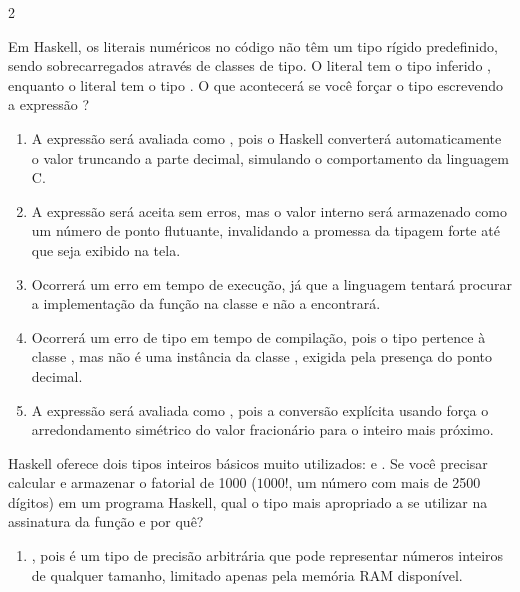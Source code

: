 \documentclass[a4paper,10pt,brazil]{article}
\begin{document}
\begin{multicols}{2}
\begin{enumerate}
\end{enumerate}

Em Haskell, os literais numéricos no código não têm um tipo rígido predefinido, sendo sobrecarregados através de classes de tipo. O literal  tem o tipo inferido , enquanto o literal  tem o tipo . 
O que acontecerá se você forçar o tipo escrevendo a expressão ?

\begin{enumerate}
  \item A expressão será avaliada como , pois o Haskell converterá automaticamente o valor truncando a parte decimal, simulando o comportamento da linguagem C.

  \item A expressão será aceita sem erros, mas o valor interno será armazenado como um número de ponto flutuante, invalidando a promessa da tipagem forte até que seja exibido na tela.

  \item Ocorrerá um erro em tempo de execução, já que a linguagem tentará procurar a implementação da função  na classe  e não a encontrará.

  \item Ocorrerá um erro de tipo em tempo de compilação, pois o tipo  pertence à classe , mas não é uma instância da classe , exigida pela presença do ponto decimal.

  \item A expressão será avaliada como , pois a conversão explícita usando \haskellinline{::} força o arredondamento simétrico do valor fracionário para o inteiro mais próximo.


\end{enumerate}

Haskell oferece dois tipos inteiros básicos muito utilizados:  e . Se você precisar calcular e armazenar o fatorial de 1000 ($1000!$, um número com mais de 2500 dígitos) em um programa Haskell, qual o tipo mais apropriado a se utilizar na assinatura da função e por quê?

\begin{enumerate}
  \item {}, pois é um tipo de precisão arbitrária que pode representar números inteiros de qualquer tamanho, limitado apenas pela memória RAM disponível.


\end{enumerate}
\end{multicols}
\end{document}
